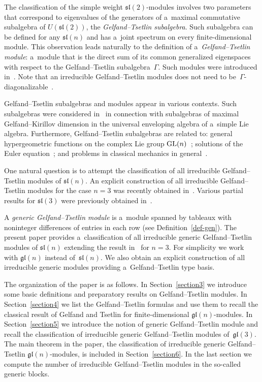 \documentclass[pdftex]{sigma}
\numberwithin{equation}{section}
\begin{document}
The classif\/ication of the simple weight $\mathfrak{sl}(2)$-modules involves two parameters that correspond to
eigenvalues of the generators of a~maximal commutative subalgebra of $U(\mathfrak{sl}(2))$, the {\it Gelfand--Tsetlin
subalgebra}.
Such subalgebra can be def\/ined for any $\mathfrak{sl}(n)$ and has a~joint spectrum on every f\/inite-dimensional module.
This observation leads naturally to the def\/inition of a~{\it Gelfand--Tsetlin module}: a~module that is the direct sum
of its common generalized eigenspaces with respect to the Gelfand--Tsetlin subalgebra~$\Gamma$.
Such modules were introduced in~\cite{DFO3, DFO2,DFO1}.
Note that an irreducible Gelfand--Tsetlin modules does not need to be~$\Gamma$-diagonalizable~\cite{Fut1}.

Gelfand--Tsetlin subalgebras and modules appear in various contexts.
Such subalgebras were considered in~\cite{Vi} in connection with subalgebras of maximal Gelfand--Kirillov dimension in
the universal enveloping algebra of a~simple Lie algebra.
Furthermore, Gelfand--Tsetlin subalgebras are related to: general hypergeometric functions on the complex Lie group
${\rm GL}(n)$~\cite{Gr1,Gr2}; solutions of the Euler equation~\cite{Vi}; and problems in classical mechanics in
general~\cite{KW-1,KW-2}.

One natural question is to attempt the classif\/ication of all irreducible Gelfand--Tsetlin mo\-du\-les of $\mathfrak{sl}(n)$.
An explicit construction of all irreducible Gelfand--Tsetlin modules for the case $n=3$ was recently obtained
in~\cite{FGR}.
Various partial results for $\mathfrak{sl}(3)$ were previously obtained in~\cite{Britten-Futorny-Lemire, Fut1,Fut3,Fut2,
Fut4}.

A {\it generic Gelfand--Tsetlin module} is a~module spanned by tableaux with noninteger dif\/fe\-ren\-ces of entries in each
row (see Def\/inition~\ref{def-gen}).
The present paper provides a~classif\/ication of all irreducible generic Gelfand--Tsetlin modules of $\mathfrak{sl}(n)$
extending the result in~\cite{Ramirez-theses} for $n=3$.
For simplicity we work with $\mathfrak{gl}(n)$ instead of~$\mathfrak{sl}(n)$.
We also obtain an explicit construction of all irreducible generic modules providing a~Gelfand--Tsetlin type basis.

The organization of the paper is as follows.
In Section~\ref{section3} we introduce some basic def\/initions and preparatory results on Gelfand--Tsetlin modules.
In Section~\ref{section4} we list the Gelfand--Tsetlin formulas and use them to recall the classical result of Gelfand
and Tsetlin for f\/inite-dimensional $\mathfrak{gl}(n)$-modules.
In Section~\ref{section5} we introduce the notion of generic Gelfand--Tsetlin module and recall the classif\/ication of
irreducible generic Gelfand--Tsetlin modules of~$\mathfrak{gl} (3)$.
The main theorem in the paper, the classif\/ication of irreducible generic Gelfand--Tsetlin $\mathfrak{gl} (n)$-modules,
is included in Section~\ref{section6}.
In the last section we compute the number of irreducible Gelfand--Tsetlin modules in the so-called generic blocks.
\end{document}
